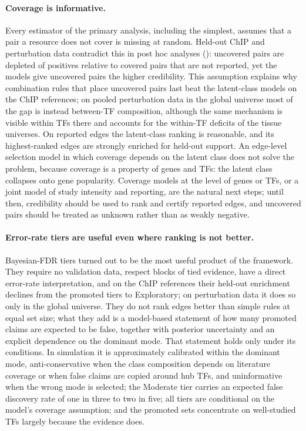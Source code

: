 \paragraph{Coverage is informative.}
Every estimator of the primary analysis, including the simplest, assumes that a pair a resource does not cover is missing at random.
Held-out ChIP and perturbation data contradict this in post hoc analyses (): uncovered pairs are depleted of positives relative to covered pairs that are not reported, yet the models give uncovered pairs the higher credibility.
This assumption explains why combination rules that place uncovered pairs last beat the latent-class models on the ChIP references; on pooled perturbation data in the global universe most of the gap is instead between-TF composition, although the same mechanism is visible within TFs there and accounts for the within-TF deficits of the tissue universes.
On reported edges the latent-class ranking is reasonable, and its highest-ranked edges are strongly enriched for held-out support.
An edge-level selection model in which coverage depends on the latent class does not solve the problem, because coverage is a property of genes and TFs: the latent class collapses onto gene popularity.
Coverage models at the level of genes or TFs, or a joint model of study intensity and reporting, are the natural next steps; until then, credibility should be used to rank and certify reported edges, and uncovered pairs should be treated as unknown rather than as weakly negative.

\paragraph{Error-rate tiers are useful even where ranking is not better.}
Bayesian-FDR tiers turned out to be the most useful product of the framework.
They require no validation data, respect blocks of tied evidence, have a direct error-rate interpretation, and on the ChIP references their held-out enrichment declines from the promoted tiers to Exploratory; on perturbation data it does so only in the global universe.
They do not rank edges better than simple rules at equal set size; what they add is a model-based statement of how many promoted claims are expected to be false, together with posterior uncertainty and an explicit dependence on the dominant mode.
That statement holds only under its conditions.
In simulation it is approximately calibrated within the dominant mode, anti-conservative when the class composition depends on literature coverage or when false claims are copied around hub TFs, and uninformative when the wrong mode is selected; the Moderate tier carries an expected false discovery rate of one in three to two in five; all tiers are conditional on the model's coverage assumption; and the promoted sets concentrate on well-studied TFs largely because the evidence does.

